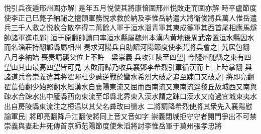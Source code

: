 悦引兵夜遁邢州圍亦解|{
	是年五月悦使其將康愔圍邢州悦敗走而圍亦解}
時平盧節度使李正己巳薨子納祕之擅領軍務悦求救於納及李惟岳納遣大將衛俊將兵萬人惟岳遣兵三千人救之悦收合散卒得二萬餘人軍于洹水淄青軍其東成德軍其西首尾相應馬燧帥諸軍進屯鄴|{
	洹于原翻帥讀曰率洹水縣屬魏州本漢内黄地後周武帝置洹水縣因水而名淄莊持翻鄴縣屬相州}
奏求河陽兵自助詔河陽節度使李艽將兵會之|{
	艽居包翻}
八月李納始喪奏請襲父位上不許　梁崇義兵攻江陵至四望|{
	今隨州随縣之東有四望山其山最高四望皆可見}
大敗而歸乃收兵襄鄧李希烈引軍循漢而上|{
	上時掌翻}
與諸道兵會崇義遣其將翟暉杜少誠逆戰於蠻水希烈大破之追至踈口又破之|{
	將即亮翻翟萇伯翻少始照翻水經漢水自襄陽東流又屈而西南流又東南流逕黎丘故城西又南與疎水合踈水出中廬縣西南東流至邙縣北界東入漢水謂之踈口漢水又南過宜城東夷水出自房陵縣東流注之桓温以其父名彛改曰蠻水}
二將請降希烈使將其衆先入襄陽慰諭軍民|{
	將即亮翻降戶江翻使將同上音又音如字}
崇義閉城拒守守者開門爭出不可禁崇義與妻赴井死傳首京師范陽節度使朱滔將討李惟岳軍于莫州張孝忠將

